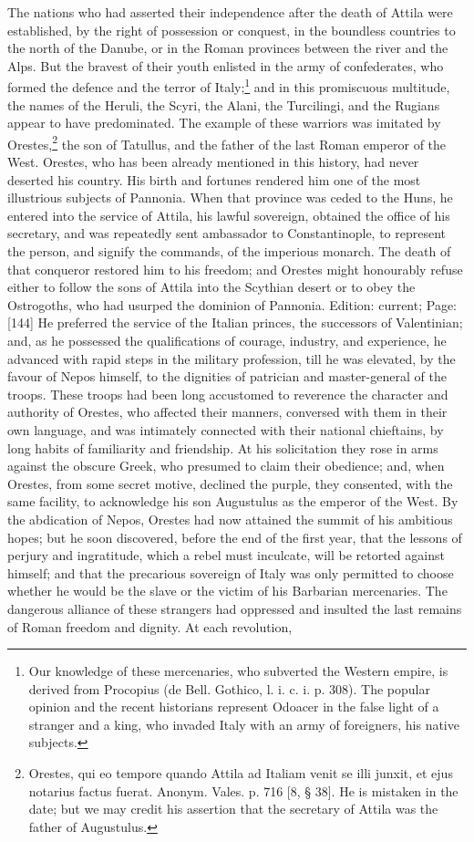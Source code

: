 The nations who had asserted their independence after the death of Attila were established, by the right of possession or conquest, in the boundless countries to the north of the Danube, or in the Roman provinces between the river and the Alps. But the bravest of their youth enlisted in the army of confederates, who formed the defence and the terror of Italy;\footnote{Our knowledge of these mercenaries, who subverted the Western empire, is derived from Procopius (de Bell. Gothico, l. i. c. i. p. 308). The popular opinion and the recent historians represent Odoacer in the false light of a stranger and a king, who invaded Italy with an army of foreigners, his native subjects.} and in this promiscuous multitude, the names of the Heruli, the Scyri, the Alani, the Turcilingi, and the Rugians appear to have predominated. The example of these warriors was imitated by Orestes,\footnote{Orestes, qui eo tempore quando Attila ad Italiam venit se illi junxit, et ejus notarius factus fuerat. Anonym. Vales. p. 716 [8, § 38]. He is mistaken in the date; but we may credit his assertion that the secretary of Attila was the father of Augustulus.} the son of Tatullus, and the father of the last Roman emperor of the West. Orestes, who has been already mentioned in this history, had never deserted his country. His birth and fortunes rendered him one of the most illustrious subjects of Pannonia. When that province was ceded to the Huns, he entered into the service of Attila, his lawful sovereign, obtained the office of his secretary, and was repeatedly sent ambassador to Constantinople, to represent the person, and signify the commands, of the imperious monarch. The death of that conqueror restored him to his freedom; and Orestes might honourably refuse either to follow the sons of Attila into the Scythian desert or to obey the Ostrogoths, who had usurped the dominion of Pannonia. Edition: current; Page: [144] He preferred the service of the Italian princes, the successors of Valentinian; and, as he possessed the qualifications of courage, industry, and experience, he advanced with rapid steps in the military profession, till he was elevated, by the favour of Nepos himself, to the dignities of patrician and master-general of the troops. These troops had been long accustomed to reverence the character and authority of Orestes, who affected their manners, conversed with them in their own language, and was intimately connected with their national chieftains, by long habits of familiarity and friendship. At his solicitation they rose in arms against the obscure Greek, who presumed to claim their obedience; and, when Orestes, from some secret motive, declined the purple, they consented, with the same facility, to acknowledge his son Augustulus as the emperor of the West. By the abdication of Nepos, Orestes had now attained the summit of his ambitious hopes; but he soon discovered, before the end of the first year, that the lessons of perjury and ingratitude, which a rebel must inculcate, will be retorted against himself; and that the precarious sovereign of Italy was only permitted to choose whether he would be the slave or the victim of his Barbarian mercenaries. The dangerous alliance of these strangers had oppressed and insulted the last remains of Roman freedom and dignity. At each revolution, 